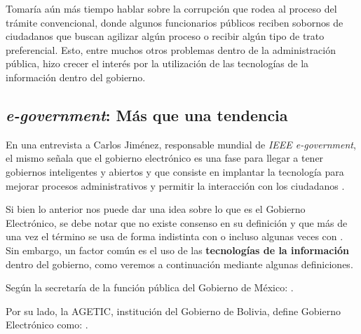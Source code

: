 Tomaría aún más tiempo hablar sobre la corrupción que rodea al proceso del trámite convencional, 
donde algunos funcionarios públicos reciben sobornos de ciudadanos que buscan agilizar algún proceso o recibir algún tipo de trato preferencial.
Esto, entre muchos otros problemas dentro de la administración pública, hizo crecer el interés por la utilización de las tecnologías de la información dentro del gobierno.

\subsection{\textit{e-government}: Más que una tendencia}

En una entrevista a Carlos Jiménez, responsable mundial de \textit{IEEE e-government}, el mismo señala que 
el gobierno electrónico es una fase para llegar a tener gobiernos inteligentes y abiertos y que 
consiste en implantar la tecnología para mejorar procesos administrativos y permitir la interacción con los ciudadanos \cite{digitalGobiernoInteligenteEntrevista2015}.

Si bien lo anterior nos puede dar una idea sobre lo que es el Gobierno Electrónico, se debe notar que no existe consenso en su definición y que más de una vez el término se usa de forma indistinta con  o incluso algunas veces con .
Sin embargo, un factor común es el uso de las \textbf{tecnologías de la información} dentro del gobierno, como veremos a continuación mediante algunas definiciones.

Según la secretaría de la función pública del Gobierno de México: 
 \cite{publicaGobiernoDigitalElectronico}.

Por su lado, la AGETIC, institución del Gobierno de Bolivia, define Gobierno Electrónico como: 
 \cite{GobiernoElectronico}.

